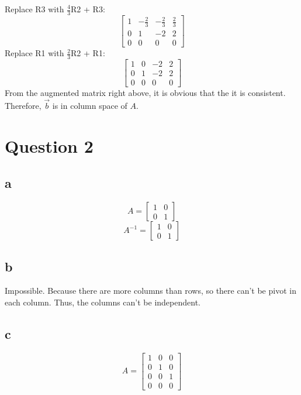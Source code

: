 \documentclass[10pt]{article}
\begin{document}
\noindent Replace R3 with $\frac{4}{3}$R2 + R3:
\begin{equation*}
    \begin{bmatrix}
        1 & -\frac{2}{3} & -\frac{2}{3} & \frac{2}{3} \\
        0 & 1 & -2 & 2 \\
        0 & 0 & 0 & 0
    \end{bmatrix}
\end{equation*}
\noindent Replace R1 with $\frac{2}{3}$R2 + R1:
\begin{equation*}
    \begin{bmatrix}
        1 & 0 & -2 & 2 \\
        0 & 1 & -2 & 2 \\
        0 & 0 & 0 & 0
    \end{bmatrix}
\end{equation*}
\noindent From the augmented matrix right above, it is obvious that the it is consistent. Therefore, $\Vec{b}$ is in column space of $A$.


\section*{Question 2}
\subsection*{a}
\begin{equation*}
    A=
    \begin{bmatrix}
        1 & 0 \\
        0 & 1
    \end{bmatrix}
\end{equation*}
\begin{equation*}
    A^{-1}=
    \begin{bmatrix}
        1 & 0 \\
        0 & 1
    \end{bmatrix}
\end{equation*}


\subsection*{b}
\noindent Impossible. Because there are more columns than rows, so there can't be pivot in each column. Thus, the columns can't be independent.


\subsection*{c}
\begin{equation*}
    A=
    \begin{bmatrix}
        1 & 0 & 0 \\
        0 & 1 & 0 \\
        0 & 0 & 1 \\
        0 & 0 & 0
    \end{bmatrix}
\end{equation*}
\end{document}
